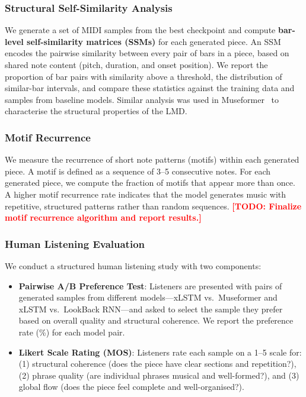 \documentclass[conference]{IEEEtran}
\newcommand{\TODO}[1]{\textcolor{red}{\textbf{[TODO: #1]}}}
\begin{document}
\subsubsection{Structural Self-Similarity Analysis}
We generate a set of MIDI samples from the best checkpoint and compute
\textbf{bar-level self-similarity matrices (SSMs)} for each generated
piece. An SSM encodes the pairwise similarity between every pair of
bars in a piece, based on shared note content (pitch, duration, and
onset position). We report the proportion of bar pairs with similarity
above a threshold, the distribution of similar-bar intervals, and
compare these statistics against the training data and samples from
baseline models. Similar analysis was used in Museformer~\cite{yu2022}
to characterise the structural properties of the LMD.

\subsubsection{Motif Recurrence}
We measure the recurrence of short note patterns (motifs) within each
generated piece. A motif is defined as a sequence of 3--5 consecutive
notes. For each generated piece, we compute the fraction of motifs that
appear more than once. A higher motif recurrence rate indicates that the
model generates music with repetitive, structured patterns rather than
random sequences.
\TODO{Finalize motif recurrence algorithm and report results.}

\subsubsection{Human Listening Evaluation}
We conduct a structured human listening study with two components:

\begin{itemize}
    \item \textbf{Pairwise A/B Preference Test}: Listeners are presented
          with pairs of generated samples from different models—xLSTM vs.\
          Museformer and xLSTM vs.\ LookBack RNN—and asked to select the
          sample they prefer based on overall quality and structural
          coherence. We report the preference rate (\%) for each model pair.
    \item \textbf{Likert Scale Rating (MOS)}: Listeners rate each sample
          on a 1--5 scale for: (1) structural coherence (does the piece
          have clear sections and repetition?), (2) phrase quality (are
          individual phrases musical and well-formed?), and (3) global
          flow (does the piece feel complete and well-organised?).
\end{itemize}
\end{document}
